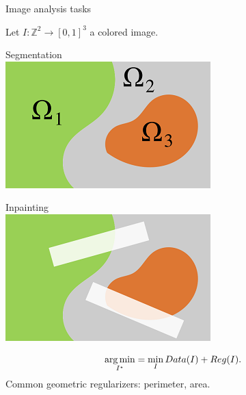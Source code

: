 \begin{frame}
{Image analysis tasks}

Let $I:\mathbb{Z}^2\rightarrow[0,1]^3$ a colored image.\\[1em]

\begin{minipage}[t][0.25\textheight][t]{0.5\textwidth}
\center
Segmentation\\

\includegraphics[scale=0.5]{figures/motivation/image-analysis/segmentation-stylised.png}
\end{minipage}%
\begin{minipage}[t][0.25\textheight][t]{0.5\textwidth}
\center
Inpainting\\

\includegraphics[scale=0.5]{figures/motivation/image-analysis/inpainting-stylised.png}
\end{minipage}%
%
\begin{align*}
 \operatorname*{arg\,min}_{I^\star} &= \min_{I} Data(I) + Reg(I).
\end{align*}
%
Common geometric regularizers: perimeter, area.

\end{frame}